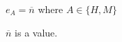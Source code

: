 \begin{case}

$e_{A}=\overline{n}$ where $A\in\lbrace H,M\rbrace$

$\overline{n}$ is a value.

\end{case}